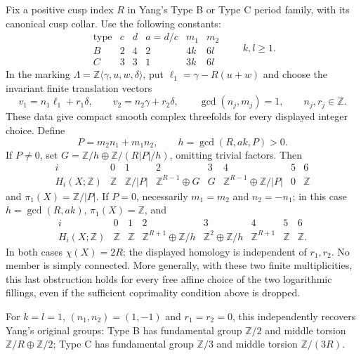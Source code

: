 \begin{theorem}
Fix a positive cusp index $R$ in Yang's Type B or Type C period
family, with its canonical cusp collar. Use the following constants:
\[
 \begin{array}{c|ccc|cc}
 \text{type}&c&d&a=d/c&m_1&m_2\\\hline
 B&2&4&2&4k&6l\\
 C&3&3&1&3k&6l
 \end{array}
 \qquad k,l\geq1.
\]
In the marking $\Lambda=\mathbb Z\langle\gamma,u,w,\delta\rangle$,
put $\ell_1=\gamma-R(u+w)$ and choose the invariant finite
translation vectors
\[
 v_1=n_1\ell_1+r_1\delta,\qquad
 v_2=n_2\gamma+r_2\delta,\qquad
 \gcd(n_j,m_j)=1,
 \qquad n_j,r_j\in\mathbb Z.
\]
These data give compact smooth complex threefolds for every displayed
integer choice. Define
\[
 P=m_2n_1+m_1n_2,\qquad h=\gcd(R,ak,P)>0.
\]
If $P\ne0$, set
$G=\mathbb Z/h\oplus\mathbb Z/(R|P|/h)$, omitting trivial factors.
Then
\[
 \begin{array}{c|ccccccc}
 i&0&1&2&3&4&5&6\\\hline
 H_i(X;\mathbb Z)&\mathbb Z&\mathbb Z/|P|&
 \mathbb Z^{R-1}\oplus G&G&
 \mathbb Z^{R-1}\oplus\mathbb Z/|P|&0&\mathbb Z
 \end{array}
\]
and $\pi_1(X)=\mathbb Z/|P|$.
If $P=0$, necessarily $m_1=m_2$ and $n_2=-n_1$; in this case
$h=\gcd(R,ak)$, $\pi_1(X)=\mathbb Z$, and
\[
 \begin{array}{c|ccccccc}
 i&0&1&2&3&4&5&6\\\hline
 H_i(X;\mathbb Z)&\mathbb Z&\mathbb Z&
 \mathbb Z^{R+1}\oplus\mathbb Z/h&
 \mathbb Z^2\oplus\mathbb Z/h&\mathbb Z^{R+1}&
 \mathbb Z&\mathbb Z.
 \end{array}
\]
In both cases $\chi(X)=2R$; the displayed homology is independent
of $r_1,r_2$. No member is simply connected. More generally, with
these two finite multiplicities, this last obstruction holds for
every free affine choice of the two logarithmic fillings, even if
the sufficient coprimality condition above is dropped.

For $k=l=1$, $(n_1,n_2)=(1,-1)$ and $r_1=r_2=0$, this independently
recovers Yang's original groups: Type B has fundamental group
$\mathbb Z/2$ and middle torsion $\mathbb Z/R\oplus\mathbb Z/2$;
Type C has fundamental group $\mathbb Z/3$ and middle torsion
$\mathbb Z/(3R)$.
\end{theorem}


